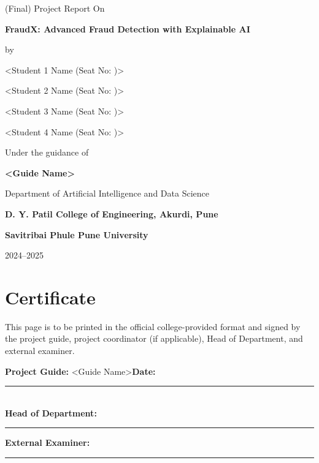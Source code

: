 \documentclass[12pt,a4paper]{report}
\newcommand{\ProjectTitle}{FraudX: Advanced Fraud Detection with Explainable AI}
\newcommand{\AcademicYear}{2024--2025}
\newcommand{\DepartmentName}{Department of Artificial Intelligence and Data Science}
\newcommand{\CollegeName}{D. Y. Patil College of Engineering, Akurdi, Pune}
\newcommand{\UniversityName}{Savitribai Phule Pune University}
\newcommand{\GuideName}{<Guide Name>}
\newcommand{\StudentA}{<Student 1 Name (Seat No: )>}
\newcommand{\StudentB}{<Student 2 Name (Seat No: )>}
\newcommand{\StudentC}{<Student 3 Name (Seat No: )>}
\newcommand{\StudentD}{<Student 4 Name (Seat No: )>}
\begin{document}
\begin{titlepage}
  \centering
  \vspace*{1.0cm}
  {\Large (Final) Project Report On\par}
  \vspace{0.6cm}
  {\LARGE \textbf{\ProjectTitle}\par}
  \vspace{1.0cm}
  {\large by\par}
  \vspace{0.4cm}
  {\large \StudentA\par}
  {\large \StudentB\par}
  {\large \StudentC\par}
  {\large \StudentD\par}
  \vspace{0.9cm}
  {\large Under the guidance of\par}
  \vspace{0.3cm}
  {\large \textbf{\GuideName}\par}
  \vfill
  {\large \DepartmentName\par}
  {\large \textbf{\CollegeName}\par}
  {\large \textbf{\UniversityName}\par}
  {\large \AcademicYear\par}
\end{titlepage}

\chapter*{Certificate}
This page is to be printed in the official college-provided format and signed by the project guide, project coordinator (if applicable), Head of Department, and external examiner.
\vspace{1.5cm}

\noindent \textbf{Project Guide:} \GuideName \hfill \textbf{Date:} \rule{3cm}{0.4pt}\\[0.8cm]
\noindent \textbf{Head of Department:} \rule{6cm}{0.4pt} \hfill \textbf{External Examiner:} \rule{4cm}{0.4pt}

\end{document}
